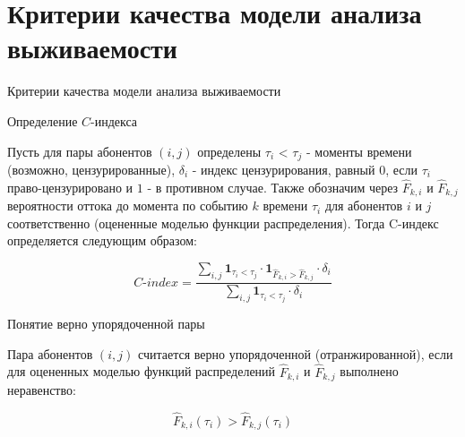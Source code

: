 \documentclass[10pt,pdf,hyperref={unicode}]{beamer}
\begin{document}
\section{Критерии качества модели анализа выживаемости}
\begin{frame}{Критерии качества модели анализа выживаемости}

\begin{block}{Определение $C$-индекса}

Пусть для пары абонентов $(i,j)$ определены $\tau_i$  < $\tau_j$ - моменты времени (возможно, цензурированные), $\delta_i$ - индекс цензурирования, равный $0$, если $\tau_i$ право-цензурировано и $1$ - в противном случае. Также обозначим через $\hat{F}_{k,i}$ и $\hat{F}_{k,j}$ вероятности оттока до момента по событию $k$ времени $\tau_i$ для абонентов $i$ и $j$ соответственно (оцененные моделью функции распределения). Тогда C-индекс определяется следующим образом:

$$C\text{-}index =
\frac{
	\sum\limits_{i,j} \mathbf{1}_{\tau_i < \tau_j} \cdot \mathbf{1}_{\hat{F}_{k,i} > \hat{F}_{k,j}} \cdot \delta_i
}{
	\sum\limits_{i,j} \mathbf{1}_{\tau_i < \tau_j} \cdot \delta_i
}$$	
	
	
\end{block}


\begin{block}{Понятие верно упорядоченной пары}

Пара абонентов $(i,j)$ считается верно упорядоченной (отранжированной), если для оцененных моделью функций распределений $\hat{F}_{k,i}$ и $\hat{F}_{k,j}$ выполнено неравенство: 

$$ \hat{F}_{k,i}(\tau_i ) >  \hat{F}_{k,j}(\tau_i ) $$ 

	
\end{block}
	
\end{frame}

\end{document}
